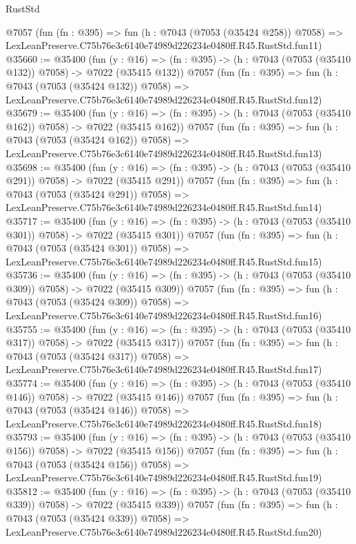\begin{lexlean}{RustStd}
\begin{coremodule}
    @7057
    (fun (fn : @395) =>
    fun (h : @7043 (@7053 (@35424 @258)) @7058) =>
    LexLeanPreserve.C75b76e3c6140e74989d226234e0480ff.R45.RustStd.fun11)
@35660 := @35400
    (fun (y : @16) => (fn : @395) -> (h : @7043 (@7053 (@35410 @132)) @7058) -> @7022 (@35415 @132))
    @7057
    (fun (fn : @395) =>
    fun (h : @7043 (@7053 (@35424 @132)) @7058) =>
    LexLeanPreserve.C75b76e3c6140e74989d226234e0480ff.R45.RustStd.fun12)
@35679 := @35400
    (fun (y : @16) => (fn : @395) -> (h : @7043 (@7053 (@35410 @162)) @7058) -> @7022 (@35415 @162))
    @7057
    (fun (fn : @395) =>
    fun (h : @7043 (@7053 (@35424 @162)) @7058) =>
    LexLeanPreserve.C75b76e3c6140e74989d226234e0480ff.R45.RustStd.fun13)
@35698 := @35400
    (fun (y : @16) => (fn : @395) -> (h : @7043 (@7053 (@35410 @291)) @7058) -> @7022 (@35415 @291))
    @7057
    (fun (fn : @395) =>
    fun (h : @7043 (@7053 (@35424 @291)) @7058) =>
    LexLeanPreserve.C75b76e3c6140e74989d226234e0480ff.R45.RustStd.fun14)
@35717 := @35400
    (fun (y : @16) => (fn : @395) -> (h : @7043 (@7053 (@35410 @301)) @7058) -> @7022 (@35415 @301))
    @7057
    (fun (fn : @395) =>
    fun (h : @7043 (@7053 (@35424 @301)) @7058) =>
    LexLeanPreserve.C75b76e3c6140e74989d226234e0480ff.R45.RustStd.fun15)
@35736 := @35400
    (fun (y : @16) => (fn : @395) -> (h : @7043 (@7053 (@35410 @309)) @7058) -> @7022 (@35415 @309))
    @7057
    (fun (fn : @395) =>
    fun (h : @7043 (@7053 (@35424 @309)) @7058) =>
    LexLeanPreserve.C75b76e3c6140e74989d226234e0480ff.R45.RustStd.fun16)
@35755 := @35400
    (fun (y : @16) => (fn : @395) -> (h : @7043 (@7053 (@35410 @317)) @7058) -> @7022 (@35415 @317))
    @7057
    (fun (fn : @395) =>
    fun (h : @7043 (@7053 (@35424 @317)) @7058) =>
    LexLeanPreserve.C75b76e3c6140e74989d226234e0480ff.R45.RustStd.fun17)
@35774 := @35400
    (fun (y : @16) => (fn : @395) -> (h : @7043 (@7053 (@35410 @146)) @7058) -> @7022 (@35415 @146))
    @7057
    (fun (fn : @395) =>
    fun (h : @7043 (@7053 (@35424 @146)) @7058) =>
    LexLeanPreserve.C75b76e3c6140e74989d226234e0480ff.R45.RustStd.fun18)
@35793 := @35400
    (fun (y : @16) => (fn : @395) -> (h : @7043 (@7053 (@35410 @156)) @7058) -> @7022 (@35415 @156))
    @7057
    (fun (fn : @395) =>
    fun (h : @7043 (@7053 (@35424 @156)) @7058) =>
    LexLeanPreserve.C75b76e3c6140e74989d226234e0480ff.R45.RustStd.fun19)
@35812 := @35400
    (fun (y : @16) => (fn : @395) -> (h : @7043 (@7053 (@35410 @339)) @7058) -> @7022 (@35415 @339))
    @7057
    (fun (fn : @395) =>
    fun (h : @7043 (@7053 (@35424 @339)) @7058) =>
    LexLeanPreserve.C75b76e3c6140e74989d226234e0480ff.R45.RustStd.fun20)

\end{coremodule}
\end{lexlean}
